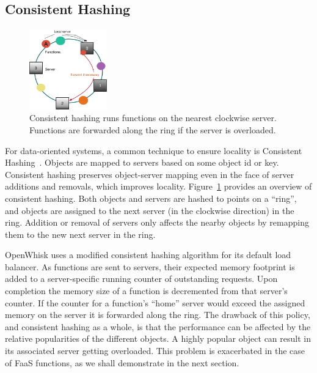 \subsection{Consistent Hashing} 
\label{subsec:ch}

\begin{figure}
  \includegraphics[width=0.3\textwidth]{../figs/ch-bl.pdf}
  \caption{Consistent hashing runs functions on the nearest clockwise server. Functions are forwarded along the ring if the server is overloaded.}
  \label{fig:ch}
\end{figure}

For data-oriented systems, a common technique to ensure locality is Consistent Hashing~\cite{karger1999web, karger1997consistent}.
Objects are mapped to servers based on some object id or key.
Consistent hashing preserves object-server mapping even in the face of server additions and removals, which improves locality.
%
Figure~\ref{fig:ch} provides an overview of consistent hashing. Both objects and servers are hashed to points on a ``ring'', and objects are assigned to the next server (in the clockwise direction) in the ring. 
Addition or removal of servers only affects the nearby objects by remapping them to the new next server in the ring.

OpenWhisk uses a modified consistent hashing algorithm for its default load balancer.
As functions are sent to servers, their expected memory footprint is added to a server-specific running counter of outstanding requests.
Upon completion the memory size of a function is decremented from that server's counter.
If the counter for a function's ``home'' server would exceed the assigned memory on the server it is forwarded along the ring.
%
The drawback of this policy, and consistent hashing as a whole, is that the performance can be affected by the relative popularities of the different objects.
A highly popular object can result in its associated server getting overloaded.
This problem is exacerbated in the case of FaaS functions, as we shall demonstrate in the next section. 


